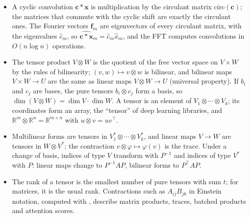 \documentclass[11pt]{article}
\newcommand{\py}[1]{\texttt{\detokenize{#1}}}
\theoremstyle{definition}
\theoremstyle{plain}
\theoremstyle{remark}
\begin{document}
\begin{itemize}[leftmargin=*]
	\item A cyclic convolution $\mathbf{c} \ast \mathbf{x}$ is multiplication by the circulant matrix $\mathrm{circ}(\mathbf{c})$; the matrices that commute with the cyclic shift are exactly the circulant ones. The Fourier vectors $\mathbf{f}_m$ are eigenvectors of every circulant matrix, with the eigenvalues $\hat{c}_m$, so $\widehat{\mathbf{c} \ast \mathbf{x}}_m = \hat{c}_m\hat{x}_m$, and the FFT computes convolutions in $O(n\log n)$ operations.
	\item The tensor product $V \otimes W$ is the quotient of the free vector space on $V \times W$ by the rules of bilinearity; $(v, w) \mapsto v \otimes w$ is bilinear, and bilinear maps $V \times W \to U$ are the same as linear maps $V \otimes W \to U$ (universal property). If $b_i$ and $c_j$ are bases, the pure tensors $b_i \otimes c_j$ form a basis, so $\dim(V \otimes W) = \dim V \cdot \dim W$. A tensor is an element of $V_1 \otimes \cdots \otimes V_k$; its coordinates form an array, the ``tensor'' of deep learning libraries, and $\mathbb{R}^m \otimes \mathbb{R}^n = \mathbb{R}^{m \times n}$ with $u \otimes v = uv^\top$.
	\item Multilinear forms are tensors in $V_1^* \otimes \cdots \otimes V_k^*$, and linear maps $V \to W$ are tensors in $W \otimes V^*$; the contraction $v \otimes \varphi \mapsto \varphi(v)$ is the trace. Under a change of basis, indices of type $V$ transform with $P^{-1}$ and indices of type $V^*$ with $P$: linear maps change to $P^{-1}AP$, bilinear forms to $P^\top AP$.
	\item The rank of a tensor is the smallest number of pure tensors with sum $t$; for matrices, it is the usual rank. Contractions such as $A_{ij}B_{jk}$ in Einstein notation, computed with \py{np.einsum}, describe matrix products, traces, batched products and attention scores.
\end{itemize}
\end{document}
